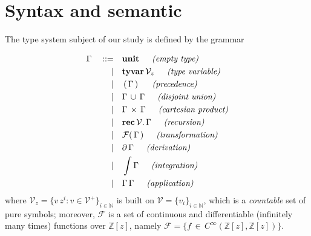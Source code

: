 \section{Syntax and semantic}

The type system subject of our study is defined by the grammar
\begin{definition}[Syntax]
\begin{displaymath}
\begin{split}
\Gamma\quad::=\quad&\tyunit\indent\textit{(empty type)} \\
             |\quad&\textbf{tyvar}\,\mathcal{V}_{z}\indent\textit{(type variable)} \\
             |\quad&\typarens{\Gamma}\indent\textit{(precedence)} \\
             |\quad&\tydu{\Gamma}{\Gamma}\indent\textit{(disjoint union)} \\
             |\quad&\tycp{\Gamma}{\Gamma}\indent\textit{(cartesian product)} \\
             |\quad&\tyrec{\mathcal{V}}{\Gamma}\indent\textit{(recursion)} \\
             |\quad&\mathcal{F}(\,\Gamma\,)\indent\textit{(transformation)} \\
             |\quad&\partial\,{\Gamma}\indent\textit{(derivation)} \\
             |\quad&\int{\Gamma}\indent\textit{(integration)} \\
             |\quad&\Gamma\,\Gamma\indent\textit{(application)} \\
\end{split}
\end{displaymath}
where $\mathcal{V}_{z} = \lbrace v\,z^{i}:v\in\mathcal{V}^{+}
\rbrace_{i\in\mathbb{N}}$ is built on $\mathcal{V}=  \lbrace v_{i}
\rbrace_{i\in\mathbb{N}}$, which is a \textit{countable} set of pure symbols;
moreover, $\mathcal{F}$ is a set of continuous and differentiable (infinitely
many times) functions over $\mathbb{Z}[z]$, namely  $\mathcal{F} = \lbrace
f\,\in\,C^{\infty}(\mathbb{Z}[z], \mathbb{Z}[z])\rbrace$.
\end{definition}

